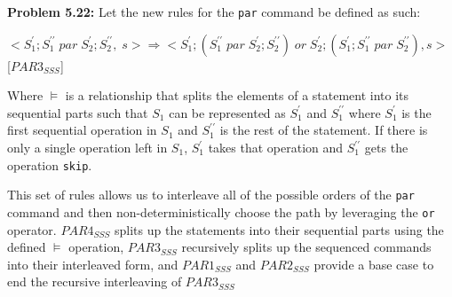 



\noindent\textbf{Problem 5.22: } Let the new rules for the \texttt{par} command be defined as such:



$<S^\prime_1;S^{\prime\prime}_1 \; par \; S^\prime_2;S^{\prime\prime}_2, \; s> \Rightarrow <S^\prime_1;(S^{\prime\prime}_1 \; par \; S^\prime_2;S^{\prime\prime}_2) \; or \; S^\prime_2;(S^\prime_1;S^{\prime\prime}_1 \; par \; S^{\prime\prime}_2), s> \;$ [$PAR3_{SSS}$]


Where $\models$ is a relationship that splits the elements of a statement into its sequential parts such that $S_1$ can be represented as $S^\prime_1$ and $S^{\prime\prime}_1$ where $S^\prime_1$ is the first sequential operation in $S_1$ and $S^{\prime\prime}_1$ is the rest of the statement. If there is only a single operation left in $S_1$, $S^\prime_1$ takes that operation and $S^{\prime\prime}_1$ gets the operation \texttt{skip}.

This set of rules allows us to interleave all of the possible orders of the \texttt{par} command and then non-deterministically choose the path by leveraging the \texttt{or} operator. $PAR4_{SSS}$ splits up the statements into their sequential parts using the defined $\models$ operation, $PAR3_{SSS}$ recursively splits up the sequenced commands into their interleaved form, and $PAR1_{SSS}$ and $PAR2_{SSS}$ provide a base case to end the recursive interleaving of $PAR3_{SSS}$


